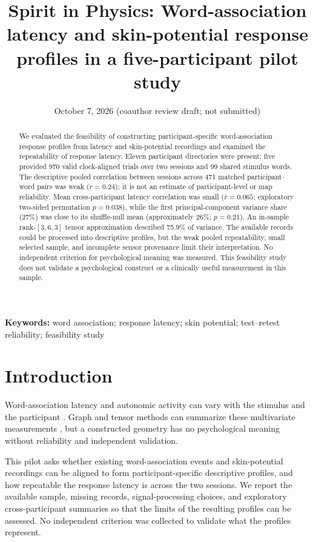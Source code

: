 \documentclass[a4paper,12pt]{article}
\title{Spirit in Physics: Word-association latency and skin-potential response profiles in a five-participant pilot study}
\date{October 7, 2026 (coauthor review draft; not submitted)}\fi
\begin{document}
\maketitle
\begin{abstract}
We evaluated the feasibility of constructing participant-specific word-association response profiles from latency and skin-potential recordings and examined the repeatability of response latency. Eleven participant directories were present; five provided 970 valid clock-aligned trials over two sessions and 99 shared stimulus words. The descriptive pooled correlation between sessions across 471 matched participant--word pairs was weak ($r=0.24$); it is not an estimate of participant-level or map reliability. Mean cross-participant latency correlation was small ($\bar r=0.065$; exploratory two-sided permutation $p=0.038$), while the first principal-component variance share (27\%) was close to its shuffle-null mean (approximately 26\%; $p=0.21$). An in-sample rank-$[3,6,3]$ tensor approximation described 75.9\% of variance. The available records could be processed into descriptive profiles, but the weak pooled repeatability, small selected sample, and incomplete sensor provenance limit their interpretation. No independent criterion for psychological meaning was measured. This feasibility study does not validate a psychological construct or a clinically useful measurement in this sample.
\end{abstract}

\noindent\textbf{Keywords:} word association; response latency; skin potential; test--retest reliability; feasibility study

\section{Introduction}
Word-association latency and autonomic activity can vary with the stimulus and the participant \citep{Jung1910}. Graph and tensor methods can summarize these multivariate measurements \citep{KoldaBader2009}, but a constructed geometry has no psychological meaning without reliability and independent validation.

This pilot asks whether existing word-association events and skin-potential recordings can be aligned to form participant-specific descriptive profiles, and how repeatable the response latency is across the two sessions. We report the available sample, missing records, signal-processing choices, and exploratory cross-participant summaries so that the limits of the resulting profiles can be assessed. No independent criterion was collected to validate what the profiles represent.
\end{document}
